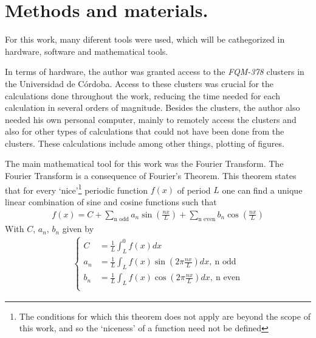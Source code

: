 \chapter{Methods and materials.}

For this work, many diferent tools were used, which will be cathegorized in hardware, software and mathematical tools. 

In terms of hardware, the author was granted access to the \textit{FQM-378} clusters in the Universidad de Córdoba. Access to these clusters was crucial for the calculations done throughout the work, reducing the time needed for each calculation in several orders of magnitude. Besides the clusters, the author also needed his own personal computer, mainly to remotely access the clusters and also for other types of calculations that could not have been done from the clusters. These calculations include among other things, plotting of figures. 

The main mathematical tool for this work was the Fourier Transform. The Fourier Transform is a consequence of Fourier's Theorem. This theorem states that for every `nice'\footnote{The conditions for which this theorem does not apply are beyond the scope of this work, and so the `niceness' of a function need not be defined} periodic function $f(x)$ of period $L$ one can find a unique linear combination of sine and cosine functions such that 
\begin{align}
	f(x) = C + \sum_\text{n odd} a_n \sin\left( \frac{nx}{L} \right) + \sum_{\text{n even}}^{} b_n \cos \left( \frac{nx}{L} \right) 
\end{align}
With $C $, $a_n$, $b_n$ given by 
\begin{align}
	\begin{cases}
		C &= \frac{1}{L} \int_{L}^{0} f(x) dx\\
		a_n &= \frac{1}{L} \int_{L}^{} f(x) \sin\left(  2\pi \frac{nx}{L} \right) dx,~\text{n odd}\\
		b_n &= \frac{1}{L} \int_{L}^{} f(x) \cos\left(  2\pi \frac{nx}{L} \right) dx,~\text{n even}\\
	\end{cases}
\end{align}


